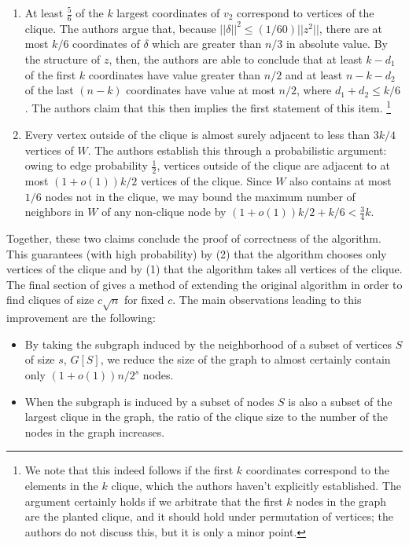 \documentclass{article}
\theoremstyle{definition}
\begin{document}
\begin{enumerate}
\item{At least $\frac{5}{6}$ of the $k$ largest coordinates of 
$v_2$ correspond to vertices of the clique.  The authors argue that, 
because $\lvert \lvert \delta \rvert \rvert^2 \leq (1/60)\lvert \lvert z^2 \rvert \rvert$, there are at most $k/6$ coordinates of $\delta$ which are greater 
than $n/3$ in absolute value.  By the structure of $z$, then, the authors 
are able to conclude that at least $k-d_1$ of the first $k$ coordinates 
have value greater than $n/2$ and at least $n-k-d_2$ of the last $(n-k)$ 
coordinates have value at most $n/2$, where $d_1 + d_2 \leq k/6$.  The 
authors claim that this then implies the first statement of this item. 
\footnote{We note that this indeed follows if the first $k$ coordinates 
correspond to the elements in the $k$ clique, which the authors haven't 
explicitly established.  The argument certainly holds if we arbitrate 
that the first $k$ nodes in the graph are the planted clique, and it 
should hold under permutation of vertices; the authors do not discuss 
this, but it is only a minor point.}}
\item{Every vertex outside of the clique is almost surely adjacent to 
less than $3k/4$ vertices of $W$.  The authors establish this through 
a probabilistic argument: owing to edge probability $\frac{1}{2}$, 
vertices outside of the clique are adjacent to at most $(1+o(1))k/2$ 
vertices of the clique.  Since $W$ also contains at most $1/6$ nodes 
not in the clique, we may bound the maximum number of neighbors in
$W$ of any non-clique node by $(1+o(1))k/2 + k/6 < \frac{3}{4}k$.}
\end{enumerate}

\noindent Together, these two claims conclude the proof of correctness 
of the algorithm.  This guarantees (with high probability) by (2) that the 
algorithm chooses only vertices of the clique and by (1) that the algorithm
takes all vertices of the clique.
\newline\newline
The final section of \cite{Spectral} gives a method of extending the 
original algorithm in order to find cliques of size $c \sqrt{n}$ for 
fixed $c$.  The main observations leading to this improvement are the 
following:

\begin{itemize}
\item{By taking the subgraph induced by the neighborhood of a 
subset of vertices $S$ of size $s$, 
$G[S]$, we reduce the size of the graph to almost certainly contain only 
$(1+o(1))n/2^s$ nodes.}
\item{When the subgraph is induced by a subset of nodes $S$ is 
also a subset of the largest clique in the graph, the ratio of the 
clique size to the number of the nodes in the graph increases.}
\end{itemize}
\end{document}
